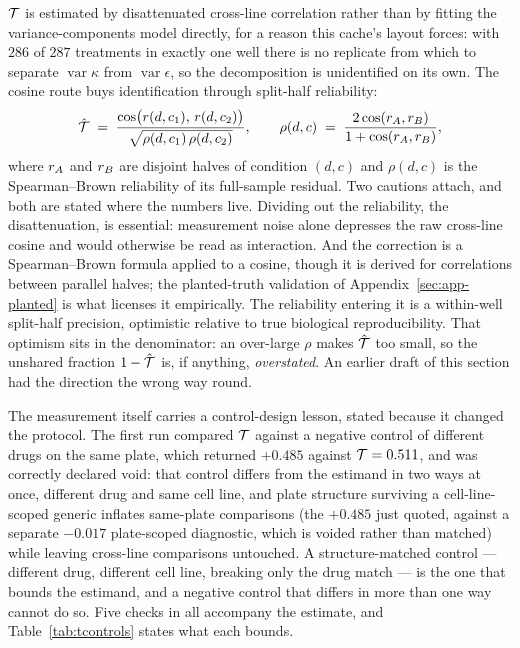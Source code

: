 $\mathcal{T}$ is estimated by disattenuated cross-line correlation rather than by fitting the
variance-components model directly, for a reason this cache's layout forces: with $286$ of $287$
treatments in exactly one well there is no replicate from which to separate
$\operatorname{var}\kappa$ from $\operatorname{var}\epsilon$, so the decomposition is unidentified
on its own. The cosine route buys identification through split-half reliability:
\begin{equation}
 \hat{\mathcal{T}} \;=\; \frac{\cos\!\big(r(d,c_1),\, r(d,c_2)\big)}
 {\sqrt{\rho(d,c_1)\,\rho(d,c_2)}},
 \qquad
 \rho(d,c) \;=\; \frac{2\cos(r_A, r_B)}{1 + \cos(r_A, r_B)},
\end{equation}
where $r_A$ and $r_B$ are disjoint halves of condition $(d,c)$ and $\rho(d,c)$ is the
Spearman--Brown reliability of its full-sample residual. Two cautions attach, and both are stated
where the numbers live. Dividing out the reliability, the disattenuation, is essential:
measurement noise alone depresses the raw cross-line cosine and would otherwise be read as
interaction. And the correction is a Spearman--Brown formula applied to a cosine, though it is
derived for correlations between parallel halves; the planted-truth validation of
Appendix~\ref{sec:app-planted} is what licenses it empirically. The reliability entering it is a
within-well split-half precision, optimistic relative to true biological reproducibility. That
optimism sits in the denominator: an over-large $\rho$ makes $\hat{\mathcal{T}}$ too small, so the
unshared fraction $1 - \hat{\mathcal{T}}$ is, if anything, \emph{overstated}. An earlier draft of this
section had the direction the wrong way round.

The measurement itself carries a control-design lesson, stated because it changed the protocol. The
first run compared $\mathcal{T}$ against a negative control of different drugs on the same plate, which
returned $+0.485$ against $\mathcal{T} = 0.511$, and was correctly declared void: that control differs
from the estimand in two ways at once, different drug and same cell line, and plate structure
surviving a cell-line-scoped generic inflates same-plate comparisons (the $+0.485$ just quoted,
against a separate $-0.017$ plate-scoped diagnostic, which is voided rather than matched) while leaving
cross-line comparisons untouched. A structure-matched control --- different drug, different cell
line, breaking only the drug match --- is the one that bounds the estimand, and a negative control
that differs in more than one way cannot do so. Five checks in all accompany the estimate, and
Table~\ref{tab:tcontrols} states what each bounds.

